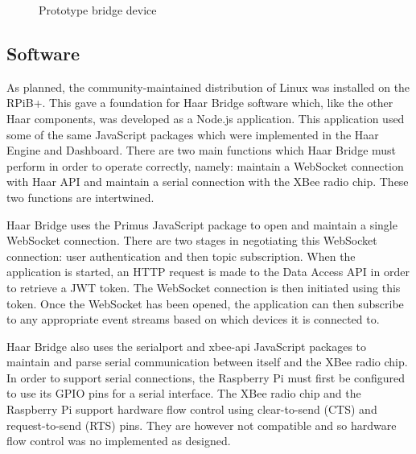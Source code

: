       \begin{figure}
        \centering
        \caption{Prototype bridge device}\label{figure:bridge-device}
      \end{figure}

    \subsection{Software}
      As planned, the community-maintained distribution of Linux was installed on the RPiB+. This gave a foundation for Haar Bridge software which, like the other Haar components, was developed as a Node.js application. This application used some of the same JavaScript packages which were implemented in the Haar Engine and Dashboard. There are two main functions which Haar Bridge must perform in order to operate correctly, namely: maintain a WebSocket connection with Haar API and maintain a serial connection with the XBee radio chip. These two functions are intertwined.

      Haar Bridge uses the Primus JavaScript package to open and maintain a single WebSocket connection. There are two stages in negotiating this WebSocket connection: user authentication and then topic subscription. When the application is started, an HTTP request is made to the Data Access API in order to retrieve a JWT token. The WebSocket connection is then initiated using this token. Once the WebSocket has been opened, the application can then subscribe to any appropriate event streams based on which devices it is connected to.

      Haar Bridge also uses the serialport and xbee-api JavaScript packages to maintain and parse serial communication between itself and the XBee radio chip. In order to support serial connections, the Raspberry Pi must first be configured to use its GPIO pins for a serial interface. The XBee radio chip and the Raspberry Pi support hardware flow control using clear-to-send (CTS) and request-to-send (RTS) pins. They are however not compatible and so hardware flow control was no implemented as designed.

